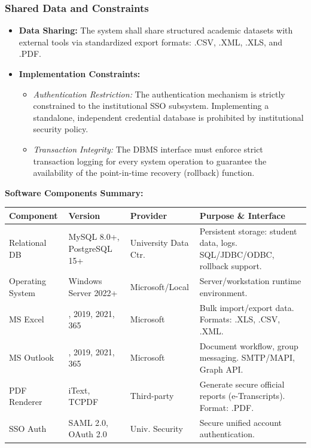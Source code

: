 \documentclass[11pt, a4paper]{article}
\renewcommand{\arraystretch}{1.3} %
\begin{document}
\subsubsection{Shared Data and Constraints}
\begin{itemize}
    \item \textbf{Data Sharing:} The system shall share structured academic datasets with external tools via standardized export formats: .CSV, .XML, .XLS, and .PDF.
    \item \textbf{Implementation Constraints:}
    \begin{itemize}
        \item \textit{Authentication Restriction:} The authentication mechanism is strictly constrained to the institutional SSO subsystem. Implementing a standalone, independent credential database is prohibited by institutional security policy.
        \item \textit{Transaction Integrity:} The DBMS interface must enforce strict transaction logging for every system operation to guarantee the availability of the point-in-time recovery (rollback) function.
    \end{itemize}
\end{itemize}

\textbf{Software Components Summary:}
\begin{table}[H]
\centering
\small
\setlength{\arraystretch}{0.9}
\begin{tabularx}{\textwidth}{>{\raggedright\arraybackslash}p{2.4cm} >{\raggedright\arraybackslash}p{1.2cm} >{\raggedright\arraybackslash}p{1.8cm} >{\raggedright\arraybackslash}X}
\toprule
\textbf{Component} & \textbf{Version} & \textbf{Provider} & \textbf{Purpose \& Interface} \\
\midrule
Relational DB & MySQL 8.0+, PostgreSQL 15+ & University Data Ctr. & Persistent storage: student data, logs. SQL/JDBC/ODBC, rollback support. \\
\midrule
Operating System & Windows Server 2022+ & Microsoft/Local & Server/workstation runtime environment. \\
\midrule
MS Excel & 2016, 2019, 2021, 365 & Microsoft & Bulk import/export data. Formats: .XLS, .CSV, .XML. \\
\midrule
MS Outlook & 2016, 2019, 2021, 365 & Microsoft & Document workflow, group messaging. SMTP/MAPI, Graph API. \\
\midrule
PDF Renderer & iText, TCPDF & Third-party & Generate secure official reports (e-Transcripts). Format: .PDF. \\
\midrule
SSO Auth & SAML 2.0, OAuth 2.0 & Univ. Security & Secure unified account authentication. \\
\bottomrule
\end{tabularx}
\normalsize
\setlength{\arraystretch}{1.3}
\end{table}
\end{document}
